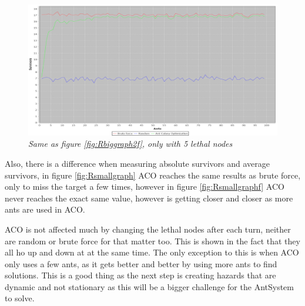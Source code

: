 \begin{figure} %
\hspace*{-1.5 cm}
\includegraphics[width=160mm]{images/Float40Nodes5Leathal2Exit.png}
\caption{\textit{Same as figure \ref{fig:Rbiggraph2f}, only with 5 lethal nodes}}
\label{fig:Rbiggraph5f}
\end{figure}
\pagebreak

 Also, there is a difference when measuring absolute survivors and average survivors, in figure \ref{fig:Rsmallgraph} ACO reaches the same results as brute force, only to miss the target a few times, however in figure \ref{fig:Rsmallgraphf} ACO never reaches the exact same value, however is getting closer and closer as more ants are used in ACO.

ACO is not affected much by changing the lethal nodes after each turn, neither are random or brute force for that matter too. This is shown in the fact that they all ho up and down at at the same time. The only exception to this is when ACO only uses a few ants, as it gets better and better by using more ants to find solutions. This is a good thing as the next step is creating hazards that are dynamic and not stationary as this will be a bigger challenge for the AntSystem to solve. 





